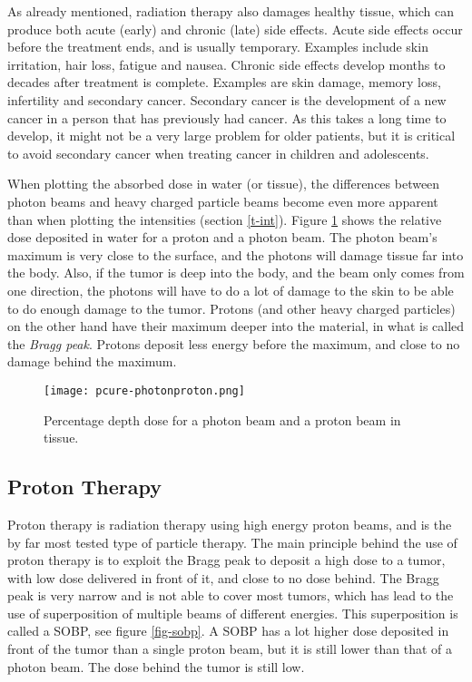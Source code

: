 \documentclass[../main/thesis.tex]{subfiles}
\begin{document}
As already mentioned, radiation therapy also damages healthy tissue, which can produce both acute (early) and chronic (late) side effects. Acute side effects occur before the treatment ends, and is usually temporary. Examples include skin irritation, hair loss, fatigue and nausea. Chronic side effects develop months to decades after treatment is complete. Examples are skin damage, memory loss, infertility and secondary cancer. Secondary cancer is the development of a new cancer in a person that has previously had cancer. As this takes a long time to develop, it might not be a very large problem for older patients, but it is critical to avoid secondary cancer when treating cancer in children and adolescents. \citep{nih} 

When plotting the absorbed dose in water (or tissue), the differences between photon beams and heavy charged particle beams become even more apparent than when plotting the intensities (section \ref{t-int}). Figure \ref{fig-photonproton} shows the relative dose deposited in water for a proton and a photon beam. The photon beam's maximum is very close to the surface, and the photons will damage tissue far into the body. Also, if the tumor is deep into the body, and the beam only comes from one direction, the photons will have to do a lot of damage to the skin to be able to do enough damage to the tumor. Protons (and other heavy charged particles) on the other hand have their maximum deeper into the material, in what is called the \textit{Bragg peak}. Protons deposit less energy before the maximum, and close to no damage behind the maximum. 

\begin{figure}[h]
	\centering
	\texttt{[image: pcure-photonproton.png]}
	\caption{Percentage depth dose for a photon beam and a proton beam in tissue. \citetext{\citeauthor{pcure}}}
	\label{fig-photonproton}
\end{figure}


\subsection{Proton Therapy} %
\label{t-proton}
Proton therapy is radiation therapy using high energy proton beams, and is the by far most tested type of particle therapy. The main principle behind the use of proton therapy is to exploit the Bragg peak to deposit a high dose to a tumor, with low dose delivered in front of it, and close to no dose behind. The Bragg peak is very narrow and is not able to cover most tumors, which has lead to the use of superposition of multiple beams of different energies. This superposition is called a \gls{SOBP}, see figure \ref{fig-sobp}. A \gls{SOBP} has a lot higher dose deposited in front of the tumor than a single proton beam, but it is still lower than that of a photon beam. The dose behind the tumor is still low. \citep[chap. 27]{Khan}
\end{document}
